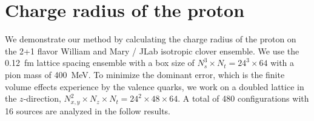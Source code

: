 \documentclass{PoS}
\begin{document}
\section{Charge radius of the proton}
We demonstrate our method by calculating the charge radius of the proton on the 2+1 flavor William and Mary / JLab isotropic clover ensemble.  We use the 0.12~fm lattice spacing ensemble with a box size of $N_s^3\times N_t = 24^3\times 64$ with a pion mass of 400~MeV. To minimize the dominant error, which is the finite volume effects experience by the valence quarks, we work on a doubled lattice in the $z$-direction,  $N_{x,y}^2 \times N_z \times N_t = 24^2\times 48\times 64$.  A total of 480 configurations with 16 sources are analyzed in the follow results.

%
%
\end{document}
